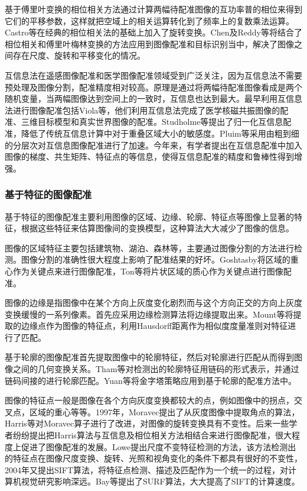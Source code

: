 \documentclass[a4paper,12pt]{article}
\begin{document}
基于傅里叶变换的相位相关方法通过计算两幅待配准图像的互功率普的相位来得到它们的平移参数，这样就把空域上的相关运算转化到了频率上的复数乘法运算。Castro等在经典的相位相关法的基础上加入了旋转变换\cite{11:article}。Chen\cite{12:article}及Reddy\cite{13:article}等将结合了相位相关和傅里叶梅林变换的方法应用到图像配准和目标识别当中，解决了图像之间存在尺度、旋转和平移变化的情况。

互信息法在遥感图像配准和医学图像配准领域受到广泛关注，因为互信息法不需要预处理及图像分割，配准精度相对较高。原理是通过将两幅待配准图像看成是两个随机变量，当两幅图像达到空间上的一致时，互信息也达到最大。最早利用互信息法进行图像配准包括Viola等，他们利用互信息法完成了医学核磁共振图像的配准、三维目标模型和真实世界图像的配准\cite{14:article}。Studholme等提出了归一化互信息配准，降低了传统互信息计算中对于重叠区域大小的敏感度\cite{15:article}。Pluim等采用由粗到细的分层次对互信息图像配准进行了加速\cite{16:article}。今年来，有学者提出在互信息配准中加入图像的梯度、共生矩阵、特征点的等信息，使得互信息配准的精度和鲁棒性得到增强。

\subsubsection{基于特征的图像配准}

基于特征的图像配准主要利用图像的区域、边缘、轮廓、特征点等图像上显著的特征，根据这些特征来估算图像间的变换模型，这种算法大大减少了图像的信息。

图像的区域特征主要包括建筑物、湖泊、森林等，主要通过图像分割的方法进行检测。图像分割的准确性很大程度上影响了配准结果的好坏。Goshtasby将区域的重心作为关键点来进行图像配准\cite{17:phdthesis}，Ton等将片状区域的质心作为关键点进行图像配准\cite{18:article}。

图像的边缘是指图像中在某个方向上灰度变化剧烈而与这个方向正交的方向上灰度变换缓慢的一系列像素。首先应采用边缘检测算法将边缘提取出来。Mount等将提取的边缘点作为图像的特征点，利用Hausdorff距离作为相似度度量准则对特征进行了匹配\cite{19:article}。

基于轮廓的图像配准首先提取图像中的轮廓特征，然后对轮廓进行匹配从而得到图像之间的几何变换关系。Tham等对检测出的轮廓特征用链码的形式表示，并通过链码间接的进行轮廓匹配\cite{20:article}。Yuan等将金字塔策略应用到基于轮廓的配准方法中\cite{21:article}。

图像的特征点一般是图像在各个方向灰度变换都较大的点，例如图像中的拐点，交叉点，区域的重心等等。1997年，Moravec提出了从灰度图像中提取角点的算法\cite{22:proceedings}，Harris等对Moravec算子进行了改进，对图像的旋转变换具有不变性\cite{23:proceedings}。后来一些学者纷纷提出把Harris算法与互信息及相位相关方法相结合来进行图像配准，很大程度上促进了图像配准的发展。Lowe提出尺度不变特征检测的方法，该方法检测出的特征点在图像尺度变换、旋转、光照和视角变化的条件下都具有很好的不变性\cite{24:proceedings}，2004年又提出SIFT算法，将特征点检测、描述及匹配作为一个统一的过程，对计算机视觉研究影响深远\cite{25:article}。Bay等提出了SURF算法，大大提高了SIFT的计算速度\cite{26:proceedings}。
\end{document}

